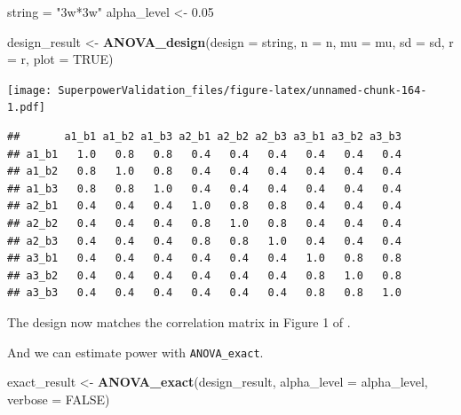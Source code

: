 \documentclass[]{book}
\newenvironment{Shaded}{\begin{snugshade}}{\end{snugshade}}
\newcommand{\DataTypeTok}[1]{\textcolor[rgb]{0.13,0.29,0.53}{#1}}
\newcommand{\FloatTok}[1]{\textcolor[rgb]{0.00,0.00,0.81}{#1}}
\newcommand{\KeywordTok}[1]{\textcolor[rgb]{0.13,0.29,0.53}{\textbf{#1}}}
\newcommand{\NormalTok}[1]{#1}
\newcommand{\OperatorTok}[1]{\textcolor[rgb]{0.81,0.36,0.00}{\textbf{#1}}}
\newcommand{\OtherTok}[1]{\textcolor[rgb]{0.56,0.35,0.01}{#1}}
\newcommand{\StringTok}[1]{\textcolor[rgb]{0.31,0.60,0.02}{#1}}
\begin{document}
\begin{Shaded}
\begin{Highlighting}[]
\NormalTok{string =}\StringTok{ "3w*3w"}
\NormalTok{alpha_level <-}\StringTok{ }\FloatTok{0.05}

\NormalTok{design_result <-}\StringTok{ }\KeywordTok{ANOVA_design}\NormalTok{(}\DataTypeTok{design =}\NormalTok{ string,}
                              \DataTypeTok{n =}\NormalTok{ n, }
                              \DataTypeTok{mu =}\NormalTok{ mu, }
                              \DataTypeTok{sd =}\NormalTok{ sd, }
                              \DataTypeTok{r =}\NormalTok{ r, }
                              \DataTypeTok{plot =} \OtherTok{TRUE}\NormalTok{)}
\end{Highlighting}
\end{Shaded}

\texttt{[image: SuperpowerValidation\_files/figure-latex/unnamed-chunk-164-1.pdf]}

\begin{Shaded}
\end{Shaded}

\begin{verbatim}
##       a1_b1 a1_b2 a1_b3 a2_b1 a2_b2 a2_b3 a3_b1 a3_b2 a3_b3
## a1_b1   1.0   0.8   0.8   0.4   0.4   0.4   0.4   0.4   0.4
## a1_b2   0.8   1.0   0.8   0.4   0.4   0.4   0.4   0.4   0.4
## a1_b3   0.8   0.8   1.0   0.4   0.4   0.4   0.4   0.4   0.4
## a2_b1   0.4   0.4   0.4   1.0   0.8   0.8   0.4   0.4   0.4
## a2_b2   0.4   0.4   0.4   0.8   1.0   0.8   0.4   0.4   0.4
## a2_b3   0.4   0.4   0.4   0.8   0.8   1.0   0.4   0.4   0.4
## a3_b1   0.4   0.4   0.4   0.4   0.4   0.4   1.0   0.8   0.8
## a3_b2   0.4   0.4   0.4   0.4   0.4   0.4   0.8   1.0   0.8
## a3_b3   0.4   0.4   0.4   0.4   0.4   0.4   0.8   0.8   1.0
\end{verbatim}

The design now matches the correlation matrix in Figure 1 of \citet{potvin2000statistical}.

And we can estimate power with \texttt{ANOVA\_exact}.

\begin{Shaded}
\begin{Highlighting}[]
\NormalTok{exact_result <-}\StringTok{ }\KeywordTok{ANOVA_exact}\NormalTok{(design_result,}
                            \DataTypeTok{alpha_level =}\NormalTok{ alpha_level,}
                            \DataTypeTok{verbose =} \OtherTok{FALSE}\NormalTok{)}
\end{Highlighting}
\end{Shaded}
\end{document}
